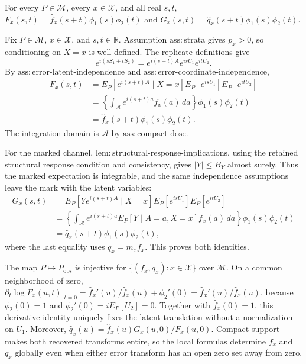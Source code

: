 For every \(P\in\mathcal M\), every \(x\in\mathcal X\), and all real \(s,t\), \(F_x(s,t)=\widehat f_x(s+t)\phi_1(s)\phi_2(t)\) and \(G_x(s,t)=\widehat q_x(s+t)\phi_1(s)\phi_2(t)\).

Fix \(P\in\mathcal M\), \(x\in\mathcal X\), and \(s,t\in\mathbb R\).  Assumption \(\mathrm{ass{:}strata}\) gives \(p_x>0\), so conditioning on \(X=x\) is well defined.  The replicate definitions give
\[
 e^{i(sS_1+tS_2)}=e^{i(s+t)A}e^{isU_1}e^{itU_2}.
\]
By \(\mathrm{ass{:}error\text{-}latent\text{-}independence}\) and \(\mathrm{ass{:}error\text{-}coordinate\text{-}independence}\),
\[
 \begin{aligned}
 F_x(s,t)
 &=E_P[e^{i(s+t)A}\mid X=x]E_P[e^{isU_1}]E_P[e^{itU_2}]\\
 &=\left\{\int_{\mathcal A}e^{i(s+t)a}f_x(a)\,da\right\}
   \phi_1(s)\phi_2(t)\\
 &=\widehat f_x(s+t)\phi_1(s)\phi_2(t).
 \end{aligned}
\]
The integration domain is \(\mathcal A\) by \(\mathrm{ass{:}compact\text{-}dose}\).

For the marked channel, \(\mathrm{lem{:}structural\text{-}response\text{-}implications}\), using the retained structural response condition and consistency, gives \(|Y|\le B_Y\) almost surely.  Thus the marked expectation is integrable, and the same independence assumptions leave the mark with the latent variables:
\[
 \begin{aligned}
 G_x(s,t)
 &=E_P[Ye^{i(s+t)A}\mid X=x]E_P[e^{isU_1}]E_P[e^{itU_2}]\\
 &=\left\{\int_{\mathcal A}e^{i(s+t)a}
 E_P[Y\mid A=a,X=x]f_x(a)\,da\right\}
 \phi_1(s)\phi_2(t)\\
 &=\widehat q_x(s+t)\phi_1(s)\phi_2(t),
 \end{aligned}
\]
where the last equality uses \(q_x=m_xf_x\).  This proves both identities.

The map \(P\mapsto P_{\mathrm{obs}}\) is injective for \(\{(f_x,q_x):x\in\mathcal X\}\) over \(\mathcal M\). On a common neighborhood of zero, \(\left.\partial_t\log F_x(u,t)\right|_{t=0}=\widehat f_x'(u)/\widehat f_x(u)+\phi_2'(0)=\widehat f_x'(u)/\widehat f_x(u)\), because \(\phi_2(0)=1\) and \(\phi_2'(0)=iE_P[U_2]=0\). Together with \(\widehat f_x(0)=1\), this derivative identity uniquely fixes the latent translation without a normalization on \(U_1\). Moreover, \(\widehat q_x(u)=\widehat f_x(u)G_x(u,0)/F_x(u,0)\). Compact support makes both recovered transforms entire, so the local formulas determine \(f_x\) and \(q_x\) globally even when either error transform has an open zero set away from zero.

